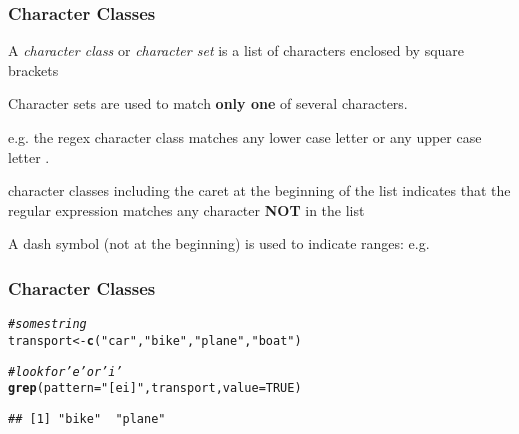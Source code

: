 \documentclass[12pt]{beamer}\usepackage[]{graphicx}\usepackage[]{color}
\makeatletter
\newcommand{\hlnum}[1]{\textcolor[rgb]{0.686,0.059,0.569}{#1}}%
\newcommand{\hlstr}[1]{\textcolor[rgb]{0.192,0.494,0.8}{#1}}%
\newcommand{\hlcom}[1]{\textcolor[rgb]{0.678,0.584,0.686}{\textit{#1}}}%
\newcommand{\hlstd}[1]{\textcolor[rgb]{0.345,0.345,0.345}{#1}}%
\newcommand{\hlkwb}[1]{\textcolor[rgb]{0.69,0.353,0.396}{#1}}%
\newcommand{\hlkwc}[1]{\textcolor[rgb]{0.333,0.667,0.333}{#1}}%
\newcommand{\hlkwd}[1]{\textcolor[rgb]{0.737,0.353,0.396}{\textbf{#1}}}%
\newenvironment{kframe}{%
 \def\at@end@of@kframe{}%
 \ifinner\ifhmode%
  \def\at@end@of@kframe{\end{minipage}}%
  \begin{minipage}{\columnwidth}%
 \fi\fi%
 \def\FrameCommand##1{\hskip\@totalleftmargin \hskip-\fboxsep
 \colorbox{shadecolor}{##1}\hskip-\fboxsep
     \hskip-\linewidth \hskip-\@totalleftmargin \hskip\columnwidth}%
 \MakeFramed {\advance\hsize-\width
   \@totalleftmargin\z@ \linewidth\hsize
   \@setminipage}}%
 {\par\unskip\endMakeFramed%
 \at@end@of@kframe}
\newenvironment{knitrout}{}{} %
\makeatother
\begin{document}

\begin{frame}[fragile]
\frametitle{Character Classes}

\bi
  \item A \textit{character class} or \textit{character set} is a list of characters enclosed by square brackets \code{[ ]}
  \item Character sets are used to match \textbf{only one} of several characters.
  \item e.g. the regex character class \code{[aA]} matches any lower case letter  or any upper case letter .
  \item character classes including the caret {\hilit \code{\^}} at the beginning of the list indicates that the regular expression matches any character \textbf{NOT} in the list
  \item A dash symbol {\hilit \code{-}} (not at the beginning) is used to indicate ranges: e.g. \code{[0-9]}
\ei

\end{frame}


\begin{frame}[fragile]
\frametitle{Character Classes}
\begin{knitrout}\footnotesize
{}\color{fgcolor}\begin{kframe}
\begin{alltt}
\hlcom{# some string}
\hlstd{transport} \hlkwb{<-} \hlkwd{c}\hlstd{(}\hlstr{"car"}\hlstd{,} \hlstr{"bike"}\hlstd{,} \hlstr{"plane"}\hlstd{,} \hlstr{"boat"}\hlstd{)}

\hlcom{# look for 'e' or 'i'}
\hlkwd{grep}\hlstd{(}\hlkwc{pattern} \hlstd{=} \hlstr{"[ei]"}\hlstd{, transport,} \hlkwc{value} \hlstd{=} \hlnum{TRUE}\hlstd{)}
\end{alltt}
\begin{verbatim}
## [1] "bike"  "plane"
\end{verbatim}
\end{kframe}
\end{knitrout}

\end{frame}

\end{document}
